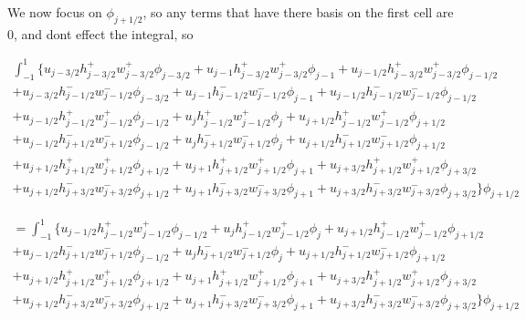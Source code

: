 \documentclass[12pt]{article}
\begin{document}
We now focus on $\phi_{j+ 1/2} $, so any terms that have there basis on the first  cell are 0, and dont effect the integral, so

\begin{multline*}
\int_{-1}^{1}  \bigg\lbrace u_{j - 3/2} h^+_{j - 3/2}w^+_{j - 3/2} \phi_{j - 3/2} + u_{j - 1} h^+_{j - 3/2}w^+_{j - 3/2}\phi_{j - 1} + u_{j - 1/2} h^+_{j - 3/2}w^+_{j - 3/2}\phi_{j - 1/2}
\\ +u_{j - 3/2}h^-_{j - 1/2}w^-_{j - 1/2}\phi_{j - 3/2} + u_{j - 1}h^-_{j - 1/2}w^-_{j - 1/2}\phi_{j - 1} + u_{j - 1/2}h^-_{j - 1/2}w^-_{j - 1/2}\phi_{j - 1/2} 
\\ +u_{j - 1/2}h^+_{j - 1/2}w^+_{j - 1/2}\phi_{j - 1/2} + u_{j}h^+_{j - 1/2}w^+_{j - 1/2}\phi_{j } + u_{j + 1/2}h^+_{j - 1/2}w^+_{j - 1/2}\phi_{j + 1/2} 
\\ +u_{j - 1/2}h^-_{j + 1/2}w^-_{j + 1/2} \phi_{j - 1/2} + u_{j}h^-_{j + 1/2}w^-_{j + 1/2} \phi_{j } + u_{j + 1/2}h^-_{j + 1/2}w^-_{j + 1/2} \phi_{j + 1/2} 
\\ + u_{j + 1/2}h^+_{j + 1/2}w^+_{j + 1/2}\phi_{j + 1/2} + u_{j + 1}h^+_{j + 1/2}w^+_{j + 1/2}\phi_{j + 1} + u_{j + 3/2}h^+_{j + 1/2}w^+_{j + 1/2}\phi_{j + 3/2} 
\\ +u_{j + 1/2}h^-_{j + 3/2}w^-_{j + 3/2}\phi_{j + 1/2} + u_{j + 1}h^-_{j + 3/2}w^-_{j + 3/2}\phi_{j + 1} + u_{j + 3/2}h^-_{j + 3/2}w^-_{j + 3/2}\phi_{j + 3/2}\bigg\rbrace\phi_{j+1/2}
\end{multline*}

\begin{multline*}
 = \int_{-1}^{1}  \bigg\lbrace  u_{j - 1/2}h^+_{j - 1/2}w^+_{j - 1/2}\phi_{j - 1/2} + u_{j}h^+_{j - 1/2}w^+_{j - 1/2}\phi_{j } + u_{j + 1/2}h^+_{j - 1/2}w^+_{j - 1/2}\phi_{j + 1/2} 
\\ +u_{j - 1/2}h^-_{j + 1/2}w^-_{j + 1/2} \phi_{j - 1/2} + u_{j}h^-_{j + 1/2}w^-_{j + 1/2} \phi_{j } + u_{j + 1/2}h^-_{j + 1/2}w^-_{j + 1/2} \phi_{j + 1/2} 
\\ + u_{j + 1/2}h^+_{j + 1/2}w^+_{j + 1/2}\phi_{j + 1/2} + u_{j + 1}h^+_{j + 1/2}w^+_{j + 1/2}\phi_{j + 1} + u_{j + 3/2}h^+_{j + 1/2}w^+_{j + 1/2}\phi_{j + 3/2} 
\\ +u_{j + 1/2}h^-_{j + 3/2}w^-_{j + 3/2}\phi_{j + 1/2} + u_{j + 1}h^-_{j + 3/2}w^-_{j + 3/2}\phi_{j + 1} + u_{j + 3/2}h^-_{j + 3/2}w^-_{j + 3/2}\phi_{j + 3/2}\bigg\rbrace\phi_{j+1/2}
\end{multline*}
\end{document}
